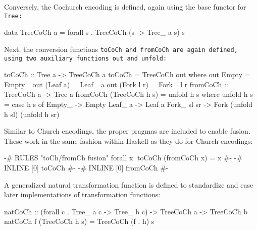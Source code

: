 Conversely, the Cochurch encoding is defined, again using the base functor for \tt{Tree}:
\begin{code}
data TreeCoCh a = forall s . TreeCoCh (s -> Tree_ a s) s
\end{code}

Next, the conversion functions \tt{toCoCh} and \tt{fromCoCh} are again defined, using two auxiliary functions \tt{out} and \tt{unfold}:
\begin{code}
toCoCh :: Tree a -> TreeCoCh a
toCoCh = TreeCoCh out
  where out Empty = Empty_
        out (Leaf a) = Leaf_ a
        out (Fork l r) = Fork_ l r
fromCoCh :: TreeCoCh a -> Tree a
fromCoCh (TreeCoCh h s) = unfold h s
  where unfold h s = case h s of
          Empty_ -> Empty
          Leaf_ a -> Leaf a
          Fork_ sl sr -> Fork (unfold h sl) (unfold h sr)
\end{code}
Similar to Church encodings, the proper pragmas are included to enable fusion.
These work in the same fashion within Haskell as they do for Church encodings:
\begin{code}
{-# RULES "toCh/fromCh fusion" forall x. toCoCh (fromCoCh x) = x #-}
{-# INLINE [0] toCoCh #-}
{-# INLINE [0] fromCoCh #-}
\end{code}
A generalized natural transformation function is defined to standardize and ease later implementations of transformation functions:
\begin{code}
natCoCh :: (forall c . Tree_ a c -> Tree_ b c) -> TreeCoCh a -> TreeCoCh b
natCoCh f (TreeCoCh h s) = TreeCoCh (f . h) s
\end{code}
